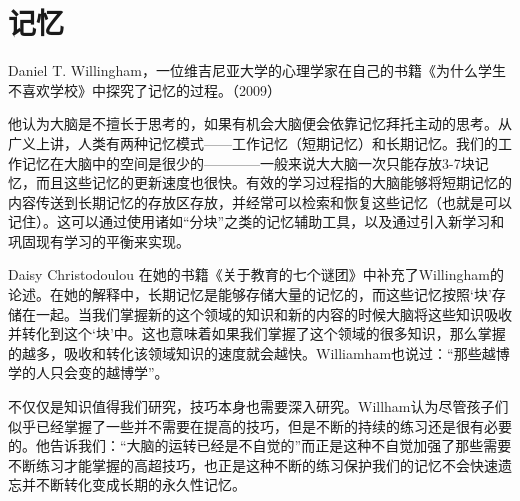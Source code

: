 \section{记忆}
    Daniel T. Willingham，一位维吉尼亚大学的心理学家在自己的书籍《为什么学生不喜欢学校》中探究了记忆的过程。（2009）\par
    他认为大脑是不擅长于思考的，如果有机会大脑便会依靠记忆拜托主动的思考。从广义上讲，人类有两种记忆模式——工作记忆（短期记忆）和长期记忆。我们的工作记忆在大脑中的空间是很少的————一般来说大大脑一次只能存放3-7块记忆，而且这些记忆的更新速度也很快。有效的学习过程指的大脑能够将短期记忆的内容传送到长期记忆的存放区存放，并经常可以检索和恢复这些记忆（也就是可以记住）。这可以通过使用诸如“分块”之类的记忆辅助工具，以及通过引入新学习和巩固现有学习的平衡来实现。 \par
    Daisy Christodoulou 在她的书籍《关于教育的七个谜团》中补充了Willingham的论述。在她的解释中，长期记忆是能够存储大量的记忆的，而这些记忆按照‘块’存储在一起。当我们掌握新的这个领域的知识和新的内容的时候大脑将这些知识吸收并转化到这个‘块’中。这也意味着如果我们掌握了这个领域的很多知识，那么掌握的越多，吸收和转化该领域知识的速度就会越快。Williamham也说过：“那些越博学的人只会变的越博学”。\par
    不仅仅是知识值得我们研究，技巧本身也需要深入研究。Willham认为尽管孩子们似乎已经掌握了一些并不需要在提高的技巧，但是不断的持续的练习还是很有必要的。他告诉我们：“大脑的运转已经是不自觉的”而正是这种不自觉加强了那些需要不断练习才能掌握的高超技巧，也正是这种不断的练习保护我们的记忆不会快速遗忘并不断转化变成长期的永久性记忆。\par
    

